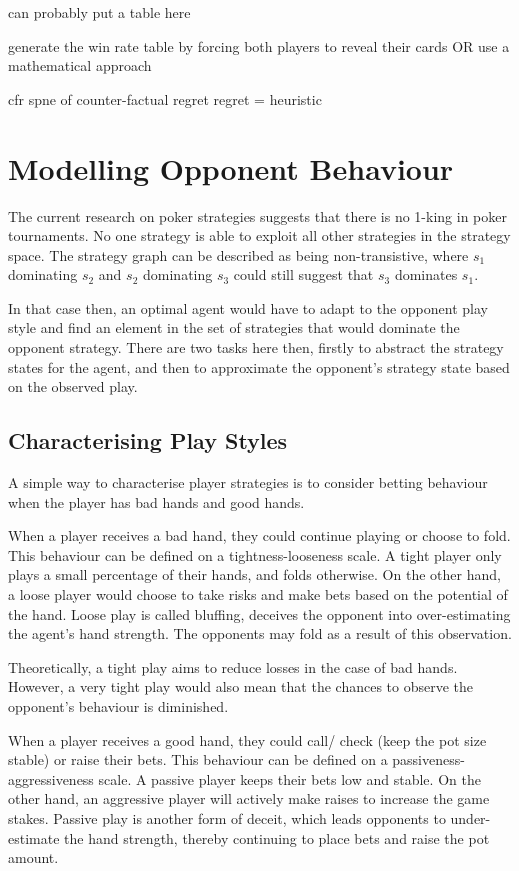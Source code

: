 \documentclass{article}
\begin{document}
can probably put a table here

generate the win rate table by forcing both players to reveal their cards
OR use a mathematical approach

cfr
spne of counter-factual regret
regret = heuristic

\section{Modelling Opponent Behaviour}

The current research on poker strategies suggests that there is no 1-king in poker tournaments. No one strategy is able to exploit all other strategies in the strategy space. The strategy graph can be described as being non-transistive, where $s_1$ dominating $s_2$ and $s_2$ dominating $s_3$ could still suggest that $s_3$ dominates $s_1$.

In that case then, an optimal agent would have to adapt to the opponent play style and find an element in the set of strategies that would dominate the opponent strategy.  There are two tasks here then, firstly to abstract the strategy states for the agent, and then to approximate the opponent's strategy state based on the observed play.

\subsection{Characterising Play Styles}
A simple way to characterise player strategies is to consider betting behaviour when the player has bad hands and good hands. 

When a player receives a bad hand, they could continue playing or choose to fold. This behaviour can be defined on a tightness-looseness scale. A tight player only plays a small percentage of their hands, and folds otherwise. On the other hand, a loose player would choose to take risks and make bets based on the potential of the hand. Loose play is called bluffing, deceives the opponent into over-estimating the agent's hand strength. The opponents may fold as a result of this observation.

Theoretically, a tight play aims to reduce losses in the case of bad hands. However, a very tight play would also mean that the chances to observe the opponent's behaviour is diminished.

When a player receives a good hand, they could call/ check (keep the pot size stable) or raise their bets. This behaviour can be defined on a passiveness-aggressiveness scale. A passive player keeps their bets low and stable. On the other hand, an aggressive player will actively make raises to increase the game stakes. Passive play is another form of deceit, which leads opponents to under-estimate the hand strength, thereby continuing to place bets and raise the pot amount.
\end{document}
